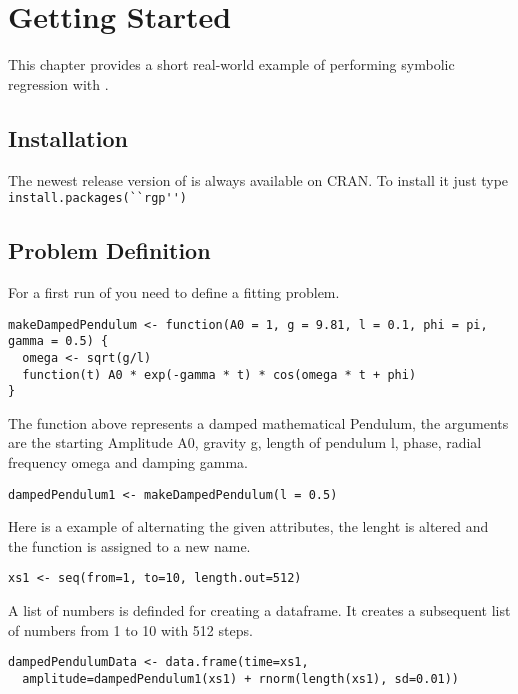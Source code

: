 
\chapter{Getting Started}
This chapter provides a short real-world example of performing symbolic regression with \RGP.

\section{Installation}

The newest release version of \RGP is always available on CRAN. To install it just type
\lstinline!install.packages(``rgp'')! 

\section{Problem Definition}

For a first run of \RGP you need to define a fitting problem.
\begin{lstlisting}[caption = {Creating a function with variables}, label = lstExample]
makeDampedPendulum <- function(A0 = 1, g = 9.81, l = 0.1, phi = pi, gamma = 0.5) {
  omega <- sqrt(g/l)
  function(t) A0 * exp(-gamma * t) * cos(omega * t + phi)
}
\end{lstlisting}

The function above represents a damped mathematical Pendulum, the arguments are the starting Amplitude A0, 
gravity g, length of pendulum l, phase, radial frequency omega and damping gamma.

\begin{lstlisting}[caption = {Attributes}, label = tutattributes]
dampedPendulum1 <- makeDampedPendulum(l = 0.5)
\end{lstlisting}

Here is a example of alternating the given attributes, 
the lenght is altered and the function is assigned to a new name.

\begin{lstlisting}[caption = {Sequence Creating }, label = tutsequence]
xs1 <- seq(from=1, to=10, length.out=512)
\end{lstlisting}

A list of numbers is definded for creating a dataframe. It creates a subsequent list of numbers from 1 to 10
with 512 steps.

\begin{lstlisting}[caption = {Data Frame Creation}, label = tutdataframe]
dampedPendulumData <- data.frame(time=xs1,
  amplitude=dampedPendulum1(xs1) + rnorm(length(xs1), sd=0.01))
\end{lstlisting}

